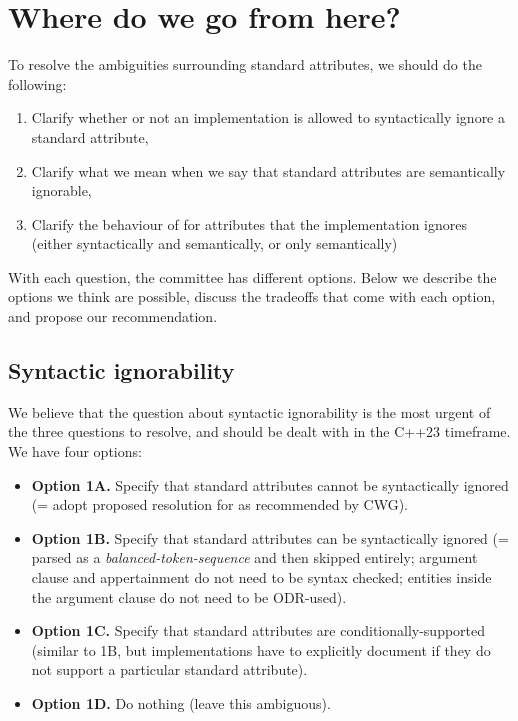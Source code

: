 \section{Where do we go from here?}

To resolve the ambiguities surrounding standard attributes, we should do the following:

\begin{enumerate}
\item Clarify whether or not an implementation is allowed to syntactically ignore a standard attribute,
\item Clarify what we mean when we say that standard attributes are semantically ignorable,
\item Clarify the behaviour of  for attributes that the implementation ignores (either syntactically and semantically, or only semantically)
\end{enumerate}

With each question, the committee has different options. Below we describe the options we think are possible, discuss the tradeoffs that come with each option, and propose our recommendation.

\subsection{Syntactic ignorability}

We believe that the question about syntactic ignorability is the most urgent of the three questions to resolve, and should be dealt with in the C++23 timeframe. We have four options:

\begin{itemize}
\item \textbf{Option 1A.} Specify that standard attributes cannot be syntactically ignored (= adopt proposed resolution for \cite{CWG2538} as recommended by CWG).
\item \textbf{Option 1B.} Specify that standard attributes can be syntactically ignored (= parsed as a \emph{balanced-token-sequence} and then skipped entirely; argument clause and appertainment do not need to be syntax checked; entities inside the argument clause do not need to be ODR-used).
\item \textbf{Option 1C.} Specify that standard attributes are conditionally-supported (similar to 1B, but implementations have to explicitly document if they do not support a particular standard attribute).
\item \textbf{Option 1D.} Do nothing (leave this ambiguous).
\end{itemize}


